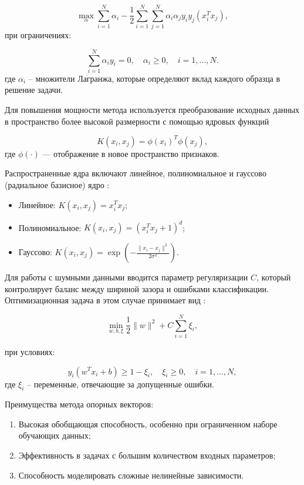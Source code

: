 \begin{equation}
    \max_{\alpha} \sum_{i=1}^N \alpha_i - \frac{1}{2} \sum_{i=1}^N \sum_{j=1}^N \alpha_i \alpha_j y_i y_j (x_i^T x_j),
\end{equation}
при ограничениях:

\begin{equation}
    \sum_{i=1}^N \alpha_i y_i = 0, \quad \alpha_i \geq 0, \quad i = 1, \ldots, N.
\end{equation}
где $\alpha_i$ -- множители Лагранжа, которые определяют вклад каждого образца в решение задачи.

Для повышения мощности метода используется преобразование исходных данных
в пространство более высокой размерности с помощью ядровых
функций

\begin{equation}
    K(x_i, x_j) = \phi(x_i)^T \phi(x_j),
\end{equation}
где $\phi(\cdot)$ — отображение в новое
пространство признаков.

Распространенные ядра включают линейное,
полиномиальное и гауссово (радиальное базисное) ядро \cite{Deris2011}:

\begin{itemize}
    \item Линейное: $K(x_i, x_j) = x_i^T x_j$;
    \item Полиномиальное: $K(x_i, x_j) = (x_i^T x_j + 1)^d$;
    \item Гауссово: $K(x_i, x_j) = \exp\left(-\frac{\|x_i - x_j\|^2}{2\sigma^2}\right)$.
\end{itemize}

Для работы с шумными данными вводится параметр регуляризации $C$,
который контролирует баланс между шириной зазора и ошибками классификации.
Оптимизационная задача в этом случае принимает вид \cite{Boswell2002}:

\begin{equation}
    \min_{w, b, \xi} \frac{1}{2} \|w\|^2 + C \sum_{i=1}^N \xi_i,
\end{equation}

при условиях:

\begin{equation}
    y_i (w^T x_i + b) \geq 1 - \xi_i, \quad \xi_i \geq 0, \quad i = 1, \ldots, N,
\end{equation}
где $\xi_i$ -- переменные, отвечающие за допущенные ошибки.

Преимущества метода опорных векторов: 

\begin{enumerate}
    \item Высокая обобщающая способность, особенно при ограниченном наборе обучающих данных;
    \item Эффективность в задачах с большим количеством входных параметров;
    \item Способность моделировать сложные нелинейные зависимости.
\end{enumerate}

